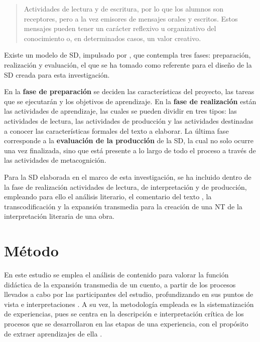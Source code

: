 \documentclass[spanish]{textolivre}
\begin{document}
\begin{quote}
    Actividades de lectura y de escritura, por lo que los alumnos son receptores, pero a la vez emisores de mensajes orales y escritos. Estos mensajes pueden tener un carácter reflexivo u organizativo del conocimiento o, en determinados casos, un valor creativo. \cite[p. 145]{ramos_estrategias_2008}
\end{quote}

Existe un modelo de SD, impulsado por \textcite{camps_secuencias_2003}, que contempla tres fases: preparación, realización y evaluación, el que se ha tomado como referente para el diseño de la SD creada para esta investigación. 

En la \textbf{fase de preparación} se deciden las características del proyecto, las tareas que se ejecutarán y los objetivos de aprendizaje. En la \textbf{fase de realización} están las actividades de aprendizaje, las cuales se pueden dividir en tres tipos: las actividades de lectura, las actividades de producción y las actividades destinadas a conocer las características formales del texto a elaborar. La última fase corresponde a la \textbf{evaluación de la producción} de la SD, la cual no solo ocurre una vez finalizada, sino que está presente a lo largo de todo el proceso a través de las actividades de metacognición.

Para la SD elaborada en el marco de esta investigación, se ha incluido dentro de la fase de realización actividades de lectura, de interpretación y de producción, empleando para ello el análisis literario, el comentario del texto \cite{cassany_taller_2006}, la transcodificación \cite{mendoza_fillola_tu_1998,ramos_estrategias_2008} y la expansión transmedia para la creación de una NT de la interpretación literaria de una obra. 

\section{Método}\label{sec-modelo}
En este estudio se emplea el análisis de contenido para valorar la función didáctica de la expansión transmedia de un cuento, a partir de los procesos llevados a cabo por las participantes del estudio, profundizando en sus puntos de vista e interpretaciones \cite{hernandez_metodologiinvestigacion_2014}. A su vez, la metodología empleada es la sistematización de experiencias, pues se centra en la descripción e interpretación crítica de los procesos que se desarrollaron en las etapas de una experiencia, con el propósito de extraer aprendizajes de ella \cite{oscar_sistematizacion_2018}.
\end{document}
